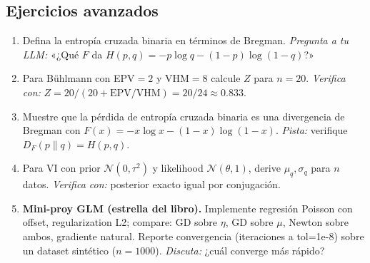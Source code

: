 \subsection*{Ejercicios avanzados}
\begin{enumerate}[resume]
	\item[$\star$] Defina la entropía cruzada binaria en términos de Bregman. \textit{Pregunta a tu LLM:} «¿Qué $F$ da $H(p,q)=-p\log q-(1-p)\log(1-q)$?»
	\item[$\star\star$] Para Bühlmann con EPV$=2$ y VHM$=8$ calcule $Z$ para $n=20$. \textit{Verifica con:} $Z=20/(20+\text{EPV}/\text{VHM})=20/24\approx 0.833$.
	\item[$\star\star\star$] Muestre que la pérdida de entropía cruzada binaria es una divergencia de Bregman con $F(x)=-x\log x-(1-x)\log(1-x)$. \textit{Pista:} verifique $D_F(p\|q)=H(p,q)$.
	\item[$\star\star\star$] Para VI con prior $\mathcal{N}(0,\tau^2)$ y likelihood $\mathcal{N}(\theta,1)$, derive $\mu_q,\sigma_q$ para $n$ datos. \textit{Verifica con:} posterior exacto igual por conjugación.
	\item[$\star\star\star\star$] \textbf{Mini-proy GLM (estrella del libro).} Implemente regresión Poisson con offset, regularization L2; compare: GD sobre $\eta$, GD sobre $\mu$, Newton sobre ambos, gradiente natural. Reporte convergencia (iteraciones a tol=1e-8) sobre un dataset sintético ($n=1000$). \textit{Discuta:} ¿cuál converge más rápido?
\end{enumerate}

